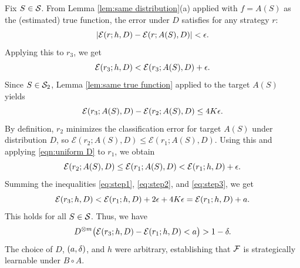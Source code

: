\begin{apdxproof}
Fix $S \in \mathcal{S}$. 
From Lemma \ref{lem:same distribution}(a) applied with $f = A(S)$ as the (estimated) true function, the error under $D$ satisfies for any strategy $r$:
\begin{equation}\label{eqn:uniform D}
    |\mathcal{E}(r; h, D) - \mathcal{E}(r; A(S), D)| < \epsilon.
\end{equation}
Applying this to $r_3$, we get
\begin{equation}\label{eq:step1}
    \mathcal{E}(r_3; h, D) < \mathcal{E}(r_3; A(S), D) + \epsilon.
\end{equation}
Since $S \in \mathcal{S}_2$, Lemma \ref{lem:same true function} applied to the target $A(S)$ yields
\begin{equation}\label{eq:step2}
    \mathcal{E}(r_3; A(S), D) - \mathcal{E}(r_2; A(S), D) \leq 4K\epsilon.
\end{equation}
By definition, $r_2$ minimizes the classification error for target $A(S)$ under distribution $D$, so $\mathcal{E}(r_2; A(S), D) \leq \mathcal{E}(r_1; A(S), D)$. Using this and applying \eqref{eqn:uniform D} to $r_1$, we obtain
\begin{equation}\label{eq:step3}
    \mathcal{E}(r_2; A(S), D) \leq \mathcal{E}(r_1; A(S), D) < \mathcal{E}(r_1; h, D) + \epsilon.
\end{equation}
Summing the inequalities \eqref{eq:step1}, \eqref{eq:step2}, and \eqref{eq:step3}, we get
\[
\mathcal{E}(r_3; h, D) < \mathcal{E}(r_1; h, D) + 2\epsilon + 4K\epsilon = \mathcal{E}(r_1; h, D) + a.
\]
This holds for all $S \in \mathcal{S}$. Thus, we have
\[
D^{\otimes m}\big(\mathcal{E}(r_3; h, D) - \mathcal{E}(r_1; h, D) < a\big) > 1 - \delta.
\]
The choice of $D$, $(a,\delta)$, and $h$ were arbitrary, establishing that $\mathcal{F}$ is strategically learnable under $B \circ A$.
\end{apdxproof}
